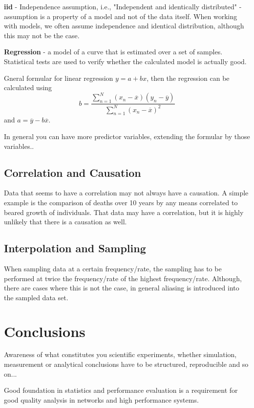 \textbf{iid} - Independence assumption, i.e., "Independent and identically distributed" - assumption is a property of a model and not of the data itself. When working with models, we often assume independence and identical distribution, although this may not be the case.

\textbf{Regression} - a model of a curve that is estimated over a set of samples.
Statistical tests are used to verify whether the calculated model is actually good.

Gneral formular for linear regression $y = a + bx$, then the regression can be calculated using $$b = \dfrac{\sum_{n=1}^{N} (x_n - \overline{x})(y_n - \overline{y})}{\sum_{n=1}^{N} (x_n - \overline{x})^2}$$ and $a = \overline{y} - b \overline{x}$.

In general you can have more predictor variables, extending the formular by those variables..

\subsection{Correlation and Causation}

Data that seems to have a correlation may not always have a causation. A simple example is the comparison of deaths over 10 years by any means correlated to beared growth of individuals. That data may have a correlation, but it is highly unlikely that there is a causation as well.

\subsection{Interpolation and Sampling}

When sampling data at a certain frequency/rate, the sampling has to be performed at twice the frequency/rate of the highest frequency/rate. Although, there are cases where this is not the case, in general aliasing is introduced into the sampled data set.

\section{Conclusions}

Awareness of what constitutes you scientific experiments, whether simulation, measurement or analytical conclusions have to be structured, reproducible and so on...

Good foundation in statistics and performance evaluation is a requirement for good quality analysis in networks and high performance systems.























